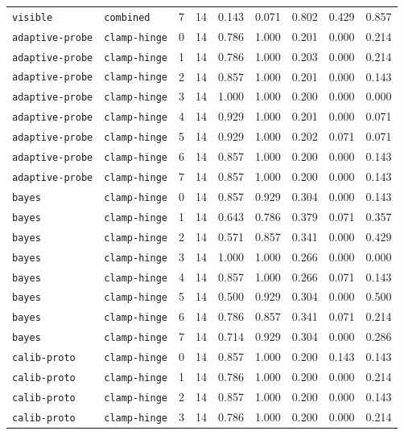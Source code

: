 \documentclass{article}
\begin{document}
\begin{center}
{\begin{tabular}{llllccccc}
\texttt{visible} & \texttt{combined} & 7 & 14 & 0.143 & 0.071 & 0.802 & 0.429 & 0.857 \\
\texttt{adaptive-probe} & \texttt{clamp-hinge} & 0 & 14 & 0.786 & 1.000 & 0.201 & 0.000 & 0.214 \\
\texttt{adaptive-probe} & \texttt{clamp-hinge} & 1 & 14 & 0.786 & 1.000 & 0.203 & 0.000 & 0.214 \\
\texttt{adaptive-probe} & \texttt{clamp-hinge} & 2 & 14 & 0.857 & 1.000 & 0.201 & 0.000 & 0.143 \\
\texttt{adaptive-probe} & \texttt{clamp-hinge} & 3 & 14 & 1.000 & 1.000 & 0.200 & 0.000 & 0.000 \\
\texttt{adaptive-probe} & \texttt{clamp-hinge} & 4 & 14 & 0.929 & 1.000 & 0.201 & 0.000 & 0.071 \\
\texttt{adaptive-probe} & \texttt{clamp-hinge} & 5 & 14 & 0.929 & 1.000 & 0.202 & 0.071 & 0.071 \\
\texttt{adaptive-probe} & \texttt{clamp-hinge} & 6 & 14 & 0.857 & 1.000 & 0.200 & 0.000 & 0.143 \\
\texttt{adaptive-probe} & \texttt{clamp-hinge} & 7 & 14 & 0.857 & 1.000 & 0.200 & 0.000 & 0.143 \\
\texttt{bayes} & \texttt{clamp-hinge} & 0 & 14 & 0.857 & 0.929 & 0.304 & 0.000 & 0.143 \\
\texttt{bayes} & \texttt{clamp-hinge} & 1 & 14 & 0.643 & 0.786 & 0.379 & 0.071 & 0.357 \\
\texttt{bayes} & \texttt{clamp-hinge} & 2 & 14 & 0.571 & 0.857 & 0.341 & 0.000 & 0.429 \\
\texttt{bayes} & \texttt{clamp-hinge} & 3 & 14 & 1.000 & 1.000 & 0.266 & 0.000 & 0.000 \\
\texttt{bayes} & \texttt{clamp-hinge} & 4 & 14 & 0.857 & 1.000 & 0.266 & 0.071 & 0.143 \\
\texttt{bayes} & \texttt{clamp-hinge} & 5 & 14 & 0.500 & 0.929 & 0.304 & 0.000 & 0.500 \\
\texttt{bayes} & \texttt{clamp-hinge} & 6 & 14 & 0.786 & 0.857 & 0.341 & 0.071 & 0.214 \\
\texttt{bayes} & \texttt{clamp-hinge} & 7 & 14 & 0.714 & 0.929 & 0.304 & 0.000 & 0.286 \\
\texttt{calib-proto} & \texttt{clamp-hinge} & 0 & 14 & 0.857 & 1.000 & 0.200 & 0.143 & 0.143 \\
\texttt{calib-proto} & \texttt{clamp-hinge} & 1 & 14 & 0.786 & 1.000 & 0.200 & 0.000 & 0.214 \\
\texttt{calib-proto} & \texttt{clamp-hinge} & 2 & 14 & 0.857 & 1.000 & 0.200 & 0.000 & 0.143 \\
\texttt{calib-proto} & \texttt{clamp-hinge} & 3 & 14 & 0.786 & 1.000 & 0.200 & 0.000 & 0.214 \\
\bottomrule
\end{tabular}%
}
\end{center}
\end{document}
